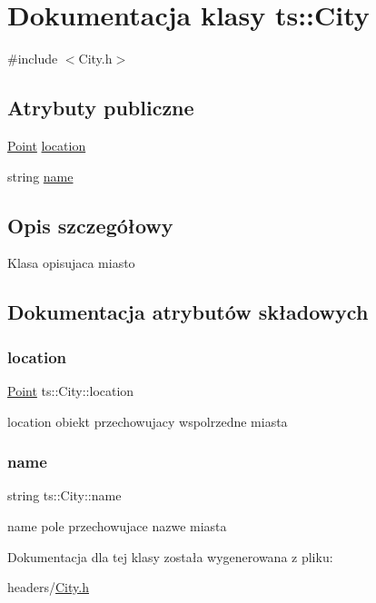 \hypertarget{classts_1_1_city}{}\section{Dokumentacja klasy ts\+:\+:City}
\label{classts_1_1_city}


{\ttfamily \#include $<$City.\+h$>$}

\subsection*{Atrybuty publiczne}
\begin{DoxyCompactItemize}
\item 
\mbox{\hyperlink{classts_1_1_point}{Point}} \mbox{\hyperlink{classts_1_1_city_abf6203580c06f5a20ab9fb1f374a386e}{location}}
\item 
string \mbox{\hyperlink{classts_1_1_city_ab0c6d6476ba2090fdfe254a8cfb55dd5}{name}}
\end{DoxyCompactItemize}


\subsection{Opis szczegółowy}
Klasa opisujaca miasto 

\subsection{Dokumentacja atrybutów składowych}
\mbox{\label{classts_1_1_city_abf6203580c06f5a20ab9fb1f374a386e}} 
\subsubsection{\texorpdfstring{location}{location}}
{\footnotesize\ttfamily \mbox{\hyperlink{classts_1_1_point}{Point}} ts\+::\+City\+::location}

location obiekt przechowujacy wspolrzedne miasta \mbox{\label{classts_1_1_city_ab0c6d6476ba2090fdfe254a8cfb55dd5}} 
\subsubsection{\texorpdfstring{name}{name}}
{\footnotesize\ttfamily string ts\+::\+City\+::name}

name pole przechowujace nazwe miasta 

Dokumentacja dla tej klasy została wygenerowana z pliku\+:\begin{DoxyCompactItemize}
\item 
headers/\mbox{\hyperlink{_city_8h}{City.\+h}}\end{DoxyCompactItemize}
